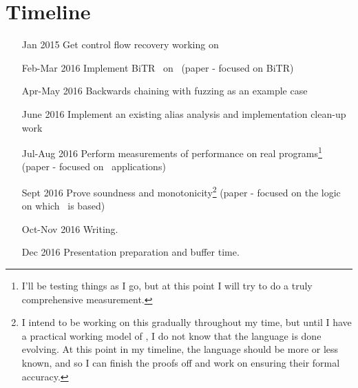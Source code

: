 \section{Timeline}
\begin{itemize}
  \item[Jan 2015] Get control flow recovery working on \sysname
  \item[Feb-Mar 2016] Implement BiTR~\cite{bitr} on \sysname\ (paper - focused on BiTR)
  \item[Apr-May 2016] Backwards chaining with fuzzing as an example case
  \item[June 2016] Implement an existing alias analysis and implementation clean-up work
  \item[Jul-Aug 2016] Perform measurements of performance on real programs\footnote{
      I'll be testing things as I go, but at this point I will try to do a truly comprehensive measurement.
    } (paper - focused on \sysname\ applications)
  \item[Sept 2016] Prove soundness and monotonicity\footnote{
      I intend to be working on this gradually throughout my time, but until I have a practical working model of \sysname, I do not know that the language is done evolving.
      At this point in my timeline, the language should be more or less known, and so I can finish the proofs off and work on ensuring their formal accuracy.
    } (paper - focused on the logic on which \sysname\ is based)
  \item[Oct-Nov 2016] Writing.
  \item[Dec 2016] Presentation preparation and buffer time.
\end{itemize}
